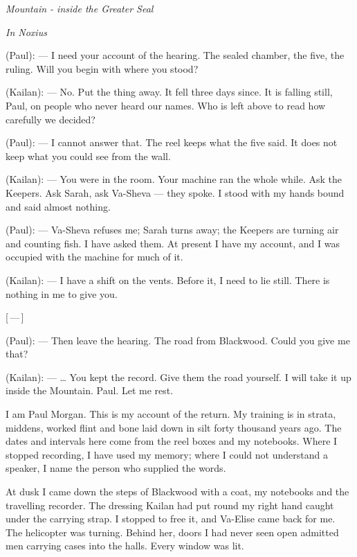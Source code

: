 
\begin{center}\small\itshape Mountain - inside the Greater Seal\end{center}

\begin{room}

\textit{In Noxius}

(Paul): --- I need your account of the hearing. The sealed chamber, the five, the ruling. Will you begin with where you stood?

(Kailan): --- No. Put the thing away. It fell three days since. It is falling still, Paul, on people who never heard our names. Who is left above to read how carefully we decided?

(Paul): --- I cannot answer that. The reel keeps what the five said. It does not keep what you could see from the wall.

(Kailan): --- You were in the room. Your machine ran the whole while. Ask the Keepers. Ask Sarah, ask Va-Sheva --- they spoke. I stood with my hands bound and said almost nothing.

(Paul): --- Va-Sheva refuses me; Sarah turns away; the Keepers are turning air and counting fish. I have asked them. At present I have my account, and I was occupied with the machine for much of it.

(Kailan): --- I have a shift on the vents. Before it, I need to lie still. There is nothing in me to give you.

\centerline{[\,---\,]}

(Paul): --- Then leave the hearing. The road from Blackwood. Could you give me that?

(Kailan): --- \ldots{} You kept the record. Give them the road yourself. I will take it up inside the Mountain. Paul. Let me rest.

\end{room}

I am Paul Morgan. This is my account of the return. My training is in strata, middens, worked flint and bone laid down in silt forty thousand years ago. The dates and intervals here come from the reel boxes and my notebooks. Where I stopped recording, I have used my memory; where I could not understand a speaker, I name the person who supplied the words.\par

At dusk I came down the steps of Blackwood with a coat, my notebooks and the travelling recorder. The dressing Kailan had put round my right hand caught under the carrying strap. I stopped to free it, and Va-Elise came back for me. The helicopter was turning. Behind her, doors I had never seen open admitted men carrying cases into the halls. Every window was lit.\par

